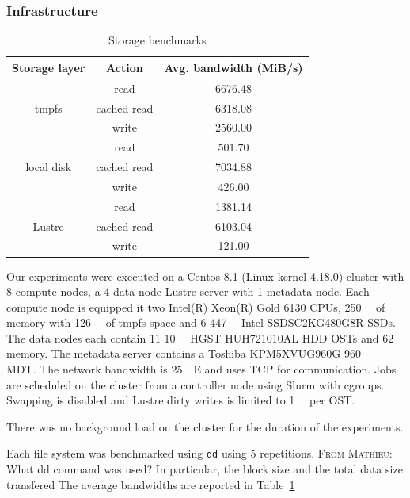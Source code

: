 \documentclass[10pt,journal,compsoc]{IEEEtran}
\newcommand{\MD}[1]{\color{magenta}\textsc{From Mathieu}: #1\xspace\color{black}}
\begin{document}
\subsubsection{Infrastructure}
      \begin{table}
      \centering
      \begin{tabular}{ccc}
       \toprule
       Storage layer & Action & Avg. bandwidth (MiB/s) \\
       \midrule
      \multirow{3}{*}{tmpfs} & read & 6676.48 \\
      & cached read & 6318.08  \\
      & write & 2560.00 \\
      \midrule
       \multirow{3}{*}{local disk} & read & 501.70  \\
       & cached read & 7034.88 \\
       & write & 426.00 \\
       \midrule
       \multirow{3}{*}{Lustre} & read & 1381.14 \\
       & cached read & 6103.04  \\
       & write & 121.00  \\

       \bottomrule

      \end{tabular}
      \caption{Storage benchmarks}
      \label{table:sea-comp:fs}
      \end{table}
            Our experiments were executed on a Centos 8.1 (Linux kernel 4.18.0)
      cluster with 8 compute nodes, a 4 data node Lustre server with 1
      metadata node. Each compute node is equipped it two Intel(R) Xeon(R) Gold
      6130 CPUs, \SI{250}{\gibi\byte} of memory with \SI{126}{\gibi\byte} of
      tmpfs space and 6 \SI{447}{\gibi\byte} Intel SSDSC2KG480G8R SSDs. The data
      nodes each contain 11 \SI{10}{\tera\byte} HGST HUH721010AL HDD OSTs and
      \SI{62}{\gibi\byte} memory. The metadata server contains a Toshiba
      KPM5XVUG960G \SI{960}{\giga\byte} MDT. The network bandwidth is
      \SI{25}{\giga\bit}E and uses TCP for communication. Jobs are scheduled on
      the cluster from a controller node using Slurm with cgroups. Swapping is
      disabled and Lustre dirty writes is limited to \SI{1}{\giga\byte} per OST.


      There was no background load on the cluster for the duration of the experiments.


      Each file system was benchmarked using \texttt{dd} using 5 repetitions. \MD{What dd command was used? In particular, the block size and the total data size transfered}
      The average bandwidths are reported in Table~\ref{table:sea-comp:fs}
\end{document}
